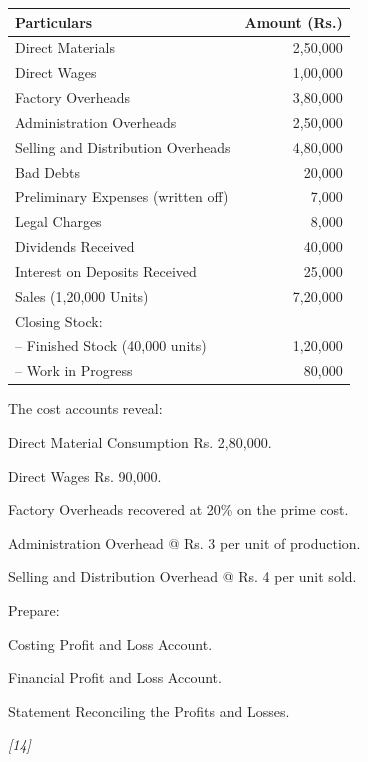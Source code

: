 \documentclass[11pt,a4paper]{article}
\newcommand{\pts}[1]{\hfill   \textit{[#1]}}
\begin{document}
\begin{center}
\small

\begin{tabular}{|l|r|}
\hline
   \textbf{Particulars} &   \textbf{Amount (Rs.)} \\
\hline
Direct Materials & 2,50,000 \\
Direct Wages & 1,00,000 \\
Factory Overheads & 3,80,000 \\
Administration Overheads & 2,50,000 \\
Selling and Distribution Overheads & 4,80,000 \\
Bad Debts & 20,000 \\
Preliminary Expenses (written off) & 7,000 \\
Legal Charges & 8,000 \\
Dividends Received & 40,000 \\
Interest on Deposits Received & 25,000 \\
Sales (1,20,000 Units) & 7,20,000 \\
Closing Stock: & \\
\quad -- Finished Stock (40,000 units) & 1,20,000 \\
\quad -- Work in Progress & 80,000 \\
\hline
\end{tabular}
\end{center}

The cost accounts reveal:

\begin{parts}
  \item Direct Material Consumption Rs. 2,80,000.
  \item Direct Wages Rs. 90,000.
  \item Factory Overheads recovered at 20\% on the prime cost.
  \item Administration Overhead @ Rs. 3 per unit of production.
  \item Selling and Distribution Overhead @ Rs. 4 per unit sold.
\end{parts}

Prepare:

\begin{parts}
  \item Costing Profit and Loss Account.
  \item Financial Profit and Loss Account.
  \item Statement Reconciling the Profits and Losses.
\end{parts}\pts{14}
\end{document}
